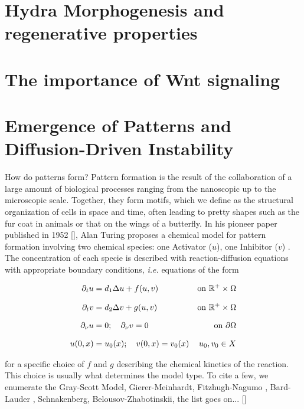 
\section{Hydra Morphogenesis and regenerative properties}

\section{The importance of Wnt signaling}

\section{Emergence of Patterns and Diffusion-Driven Instability}
How do patterns form? Pattern formation is the result of the collaboration of a large amount of biological processes ranging from the nanoscopic up to the microscopic scale. Together, they form motifs, which we define as the structural organization of cells in space and time, often leading to pretty shapes such as the fur coat in animals or that on the wings of a butterfly. In his pioneer paper  published in 1952 [], Alan Turing proposes a chemical model for pattern formation involving two chemical species: one Activator ($u$), one Inhibitor ($v$) . The concentration of each specie is described with reaction-diffusion equations  with appropriate boundary conditions, \textit{i.e.} equations of the form 


\begin{align}
	\del_t u &= d_1 \lap u + f(u, v) &\text{on} \ \R^{+} \times \Omega \notag \\[0.7em]
	\del_t v &= d_2 \lap v + g(u, v) & \text{on} \ \R^{+} \times \Omega \\[0.7em]
	\del_\nu u & = 0; \quad \del_\nu v = 0 & \text{on} \ \del\Omega \notag \\[0.7em]
	u(0, x) &= u_0(x) ; \quad v(0, x) = v_0(x) & u_0, v_0 \in X
\end{align}
\label{eq:TuringModel}



for a specific choice of $f$ and $g$ describing the chemical kinetics of the reaction. This choice is usually what determines the model type. To cite a few, we enumerate the Gray-Scott Model,  Gierer-Meinhardt, Fitzhugh-Nagumo , Bard-Lauder , Schnakenberg, Belousov-Zhabotinskii, the list goes on... []

